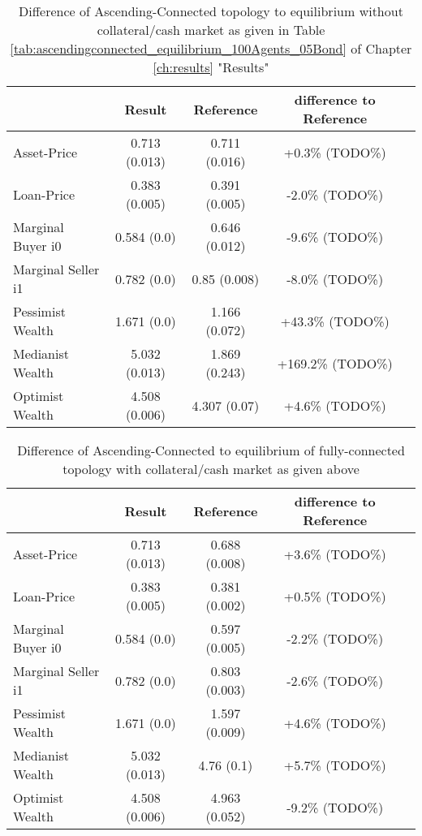 \documentclass[Bachelorarbeit.tex]{subfiles}
\begin{document}
\begin{table}[H]
	\caption{Difference of Ascending-Connected topology to equilibrium without collateral/cash market as given in Table \ref{tab:ascendingconnected_equilibrium_100Agents_05Bond} of Chapter \ref{ch:results} "Results"}
	\centering
	\begin{tabular} { l c c c r }
		& Result & Reference & difference to Reference \\
		\hline
		Asset-Price & 0.713 (0.013) & 0.711 (0.016) & +0.3\% (TODO\%) \\
		Loan-Price & 0.383 (0.005) & 0.391 (0.005) & -2.0\% (TODO\%) \\
		Marginal Buyer i0 & 0.584 (0.0) & 0.646 (0.012) & -9.6\% (TODO\%) \\
		Marginal Seller i1 & 0.782 (0.0) & 0.85 (0.008) & -8.0\% (TODO\%) \\
		\hline
		Pessimist Wealth & 1.671 (0.0) & 1.166 (0.072) & +43.3\% (TODO\%) \\
		Medianist Wealth & 5.032 (0.013) & 1.869 (0.243) & +169.2\% (TODO\%) \\
		Optimist Wealth & 4.508 (0.006) & 4.307 (0.07) & +4.6\% (TODO\%) \\
		\hline
	\end{tabular}
\end{table}

\begin{table}[H]
	\caption{Difference of Ascending-Connected to equilibrium of fully-connected topology with collateral/cash market as given above}
	\centering
	\begin{tabular} { l c c c r }
		& Result & Reference & difference to Reference \\
		\hline
		Asset-Price & 0.713 (0.013) & 0.688 (0.008) & +3.6\% (TODO\%) \\
		Loan-Price & 0.383 (0.005) & 0.381 (0.002) & +0.5\% (TODO\%) \\
		Marginal Buyer i0 & 0.584 (0.0) & 0.597 (0.005) & -2.2\% (TODO\%) \\
		Marginal Seller i1 & 0.782 (0.0) & 0.803 (0.003) & -2.6\% (TODO\%) \\
		\hline
		Pessimist Wealth & 1.671 (0.0) & 1.597 (0.009) & +4.6\% (TODO\%) \\
		Medianist Wealth & 5.032 (0.013) & 4.76 (0.1) & +5.7\% (TODO\%) \\
		Optimist Wealth & 4.508 (0.006) & 4.963 (0.052) & -9.2\% (TODO\%) \\
		\hline
	\end{tabular}
\end{table}
\end{document}
